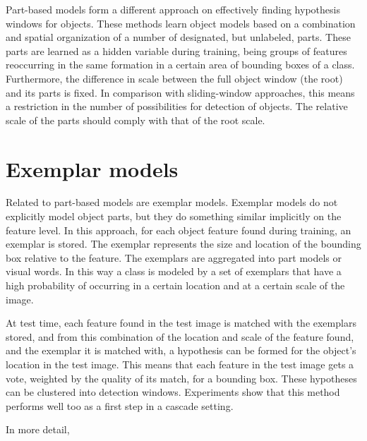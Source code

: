 Part-based models form a different approach on effectively finding hypothesis windows for objects.\cite{felzenszwalb2010object} These methods learn object models based on a combination and spatial organization of a number of designated, but unlabeled, parts. These parts are learned as a hidden variable during training, being groups of features reoccurring in the same formation in a certain area of bounding boxes of a class. Furthermore, the difference in scale between the full object window (the root) and its parts is fixed. In comparison with sliding-window approaches, this means a restriction in the number of possibilities for detection of objects. The relative scale of the parts should comply with that of the root scale. 

\section{Exemplar models} %
\label{sub:exemplar_models}

Related to part-based models are exemplar models. \cite{leibe2004combined, chum2007exemplar} Exemplar models do not explicitly model object parts, but they do something similar implicitly on the feature level. In this approach, for each object feature found during training, an exemplar is stored. The exemplar represents the size and location of the bounding box relative to the feature. The exemplars are aggregated into part models\cite{leibe2004combined} or visual words\cite{chum2007exemplar}. In this way a class is modeled by a set of exemplars that have a high probability of occurring in a certain location and at a certain scale of the image.

At test time, each feature found in the test image is matched with the exemplars stored, and from this combination of the location and scale of the feature found, and the exemplar it is matched with, a hypothesis can be formed for the object's location in the test image. This means that each feature in the test image gets a vote, weighted by the quality of its match, for a bounding box. These hypotheses can be clustered into detection windows. Experiments\cite{vedaldi2009multiple} show that this method performs well too as a first step in a cascade setting.

In more detail, 


